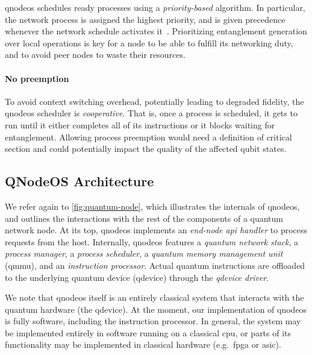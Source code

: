 \acrshort{qnodeos} schedules ready processes using a \emph{priority-based} algorithm. In particular,
the network process is assigned the highest priority, and is given precedence whenever the network
schedule activates it~\cite{skrzypczyk_2021_arch}. Prioritizing entanglement generation over local
operations is key for a node to be able to fulfill its networking duty, and to avoid peer nodes to
waste their resources.

\paragraph{No preemption}

To avoid context switching overhead, potentially leading to degraded fidelity, the
\acrshort{qnodeos} scheduler is \emph{cooperative}. That is, once a process is scheduled, it gets to
run until it either completes all of its instructions or it blocks waiting for entanglement.
Allowing process preemption would need a definition of critical section and could potentially impact
the quality of the affected qubit states.

\subsection{QNodeOS Architecture}

We refer again to \cref{fig:quantum-node}, which illustrates the internals of \acrshort{qnodeos},
and outlines the interactions with the rest of the components of a quantum network node. At its top,
\acrshort{qnodeos} implements an \emph{end-node \acrshort{api} handler} to process requests from the
host. Internally, \acrshort{qnodeos} features a \emph{quantum network stack}, a \emph{process
manager}, a \emph{process scheduler}, a \emph{quantum memory management unit} (\acrshort{qmmu}), and
an \emph{instruction processor}. Actual quantum instructions are offloaded to the underlying quantum
device (\acrshort{qdevice}) through the \emph{\acrshort{qdevice} driver}.

We note that \acrshort{qnodeos} itself is an entirely classical system that interacts with the
quantum hardware (the \acrshort{qdevice}). At the moment, our implementation of \acrshort{qnodeos}
is fully software, including the instruction processor. In general, the system may be implemented
entirely in software running on a classical \acrshort{cpu}, or parts of its functionality may be
implemented in classical hardware (e.g.~\acrshort{fpga} or \acrshort{asic}).

